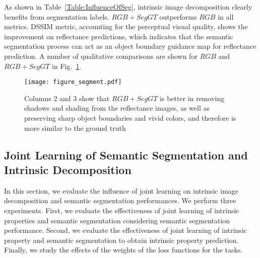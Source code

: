 \documentclass[runningheads]{llncs}
\begin{document}
\begin{table}[]
\centering
\caption{The influence of semantic segmentation on intrinsic property prediction. Providing segmentation as an additional input ($RGB+SegGT$) clearly outperforms the approach of using only $RGB$ color images as their input}
\label{Table:InfluenceOfSeg}
\end{table}

\noindent As shown in Table~\ref{Table:InfluenceOfSeg}, intrinsic image decomposition clearly benefits from segmentation labels. $RGB+SegGT$ outperforms $RGB$ in all metrics. DSSIM metric, accounting for the perceptual visual quality, shows the improvement on reflectance predictions, which indicates that the semantic segmentation process can act as an object boundary guidance map for reflectance prediction. A number of qualitative comparisons are shown for $RGB$ and $RGB+SegGT$ in Fig.~\ref{fig:RGB+Seg}.

\begin{figure}[h]
    \centering
    \texttt{[image: figure\_segment.pdf]}
    \caption{Columns 2 and 3 show that $RGB+SegGT$ is better in removing shadows and shading from the reflectance images, as well as preserving sharp object boundaries and vivid colors, and therefore is more similar to the ground truth}
    \label{fig:RGB+Seg}
\end{figure}

\subsection{Joint Learning of Semantic Segmentation and Intrinsic Decomposition}
In this section, we evaluate the influence of joint learning on intrinsic image decomposition and semantic segmentation performances. We perform three experiments. First, we evaluate the effectiveness of joint learning of intrinsic properties and semantic segmentation considering semantic segmentation performance. Second, we evaluate the effectiveness of joint learning of intrinsic property and semantic segmentation to obtain intrinsic property prediction. Finally, we study the effects of the weights of the loss functions for the tasks.
\end{document}
